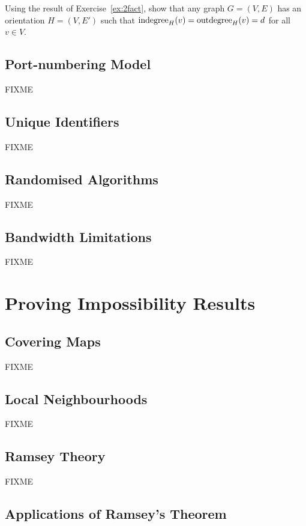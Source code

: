 \begin{ex}[orientations]
    Using the result of Exercise~\ref{ex:2fact}, show that any  graph $G = (V,E)$ has an orientation $H = (V,E')$ such that $\operatorname{indegree}_H(v) = \operatorname{outdegree}_H(v) = d$ for all $v \in V$.
\end{ex}


\chapter{Port-numbering Model}

FIXME

\chapter{Unique Identifiers}

FIXME

\chapter{Randomised Algorithms}

FIXME

\chapter{Bandwidth Limitations}

FIXME

\part{Proving Impossibility Results}

\chapter{Covering Maps}

FIXME

\chapter{Local Neighbourhoods}

FIXME

\chapter{Ramsey Theory}

FIXME

\chapter{Applications of Ramsey's Theorem}

